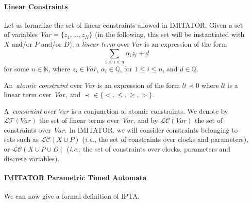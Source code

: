 \documentclass[a4paper,11pt]{report}
\newcommand{\Clock}{X} %
\newcommand{\DVar}{D} %
\newcommand{\LConstraint}{\mathcal{LC}} %
\newcommand{\LConstraintXP}{\LConstraint(\Clock \cup \Param)}
\newcommand{\LConstraintXPD}{\LConstraint(\Clock \cup \Param \cup \DVar)}
\newcommand{\lterm}{\mathit{lt}}
\newcommand{\LTerm}{\mathcal{LT}} %
\newcommand{\Param}{P} %
\newcommand{\Var}{\mathit{Var}} %
\newcommand{\var}{\mathit{z}} %
\newcommand{\VarCard}{N} %
\newcommand{\grandn}{{\mathbb N}}
\newcommand{\grandq}{{\mathbb Q}}
\newcommand{\imitator}{\textsf{IMITATOR}}
\newcommand{\IPTA}{IPTA}
\newcommand{\ie}{\textcolor{colorok}{\textit{i.e.}, }}
\begin{document}
\paragraph{Linear Constraints}
Let us formalize the set of linear constraints allowed in \imitator{}.
Given a set of variables~$\Var = \{ \var_1, \dots, \var_\VarCard \}$ (in the following, this set will be instantiated with $\Clock$ and/or $\Param$ and/or $\DVar$), a \emph{linear term} over $\Var$ is an expression of the form
$$
\sum_{1 \leq i \leq n} \alpha_i \var_i + d
$$
for some $n \in \grandn$,
	where
	$\var_{i} \in \Var$,
	$\alpha_{i} \in \grandq$, for $1 \leq i \leq n$,
	and
	$d \in \grandq$.

An~\emph{atomic constraint} over $\Var$ is an expression of the form
$
\lterm \prec 0
$
	where
	$\lterm$ is a linear term over~$\Var$,
	and
	$\prec \in \{<, \leq, \geq, >\}$.

A~\emph{constraint} over $\Var$ is a conjunction of atomic constraints.
We denote by $\LTerm(\Var)$ the set of linear terms over~$\Var$, and by $\LConstraint(\Var)$ the set of constraints over~$\Var$.
In \imitator{}, we will consider constraints belonging to sets such as $\LConstraintXP$ (\ie{} the set of constraints over clocks and parameters), or $\LConstraintXPD$ (\ie{} the set of constraints over clocks, parameters and discrete variables).



\paragraph{\imitator{} Parametric Timed Automata}
We can now give a formal definition of \IPTA{}.
\end{document}
